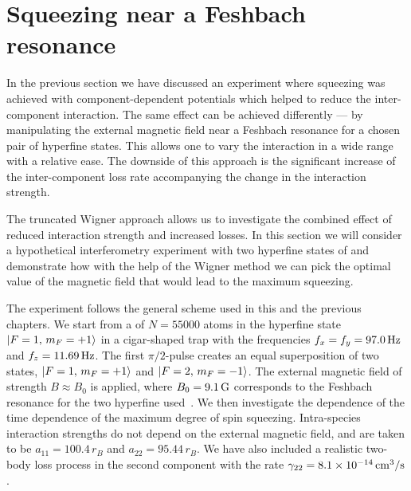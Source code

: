 \section{Squeezing near a Feshbach resonance}

In the previous section we have discussed an experiment where squeezing was achieved with component-dependent potentials which helped to reduce the inter-component interaction.
The same effect can be achieved differently --- by manipulating the external magnetic field near a Feshbach resonance for a chosen pair of hyperfine states.
This allows one to vary the interaction in a wide range with a relative ease.
The downside of this approach is the significant increase of the inter-component loss rate accompanying the change in the interaction strength.

The truncated Wigner approach allows us to investigate the combined effect of reduced interaction strength and increased losses.
In this section we will consider a hypothetical interferometry experiment with two hyperfine states of \Rb{} and demonstrate how with the help of the Wigner method we can pick the optimal value of the magnetic field that would lead to the maximum squeezing.

The experiment follows the general scheme used in this and the previous chapters.
We start from a  of $N = 55000$ \Rb{} atoms in the hyperfine state ${\mbox{\ensuremath{\vert F=1,\, m_F=+1 \rangle}}}$ in a cigar-shaped trap with the frequencies $f_x = f_y = 97.0\mbox{\ensuremath{\,\mathrm{Hz}}}$ and $f_z = 11.69\mbox{\ensuremath{\,\mathrm{Hz}}}$.
The first $\pi/2$-pulse creates an equal superposition of two states, ${\mbox{\ensuremath{\vert F=1,\, m_F=+1 \rangle}}}$ and ${\mbox{\ensuremath{\vert F=2,\, m_F=-1 \rangle}}}$.
The external magnetic field of strength $B \approx B_0$ is applied, where $B_0 = 9.1\mbox{\ensuremath{\,\mathrm{G}}}$ corresponds to the Feshbach resonance for the two hyperfine used~\cite{Kaufman2009}.
We then investigate the dependence of the time dependence of the maximum degree of spin squeezing.
Intra-species interaction strengths do not depend on the external magnetic field, and are taken to be $a_{11} = 100.4\,r_B$ and $a_{22} = 95.44\,r_B$.
We have also included a realistic two-body loss process in the second component with the rate $\gamma_{22} = 8.1 \times 10^{-14} \mbox{\ensuremath{\,\mathrm{cm^3/s}}}$.

